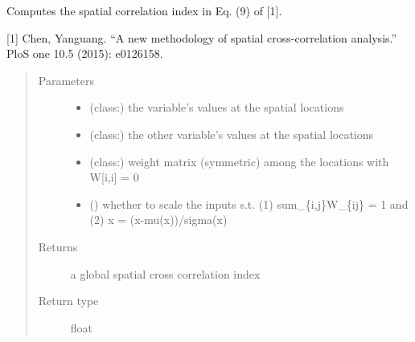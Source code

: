 \documentclass[letterpaper,10pt,english]{sphinxmanual}
\begin{document}
\begin{fulllineitems}
\label{\detokenize{api:spaotsc.SpaOTsc.sci}}
Computes the spatial correlation index in Eq. (9) of {[}1{]}.

{[}1{]} Chen, Yanguang. “A new methodology of spatial cross-correlation
analysis.” PloS one 10.5 (2015): e0126158.
\begin{quote}\begin{description}
\item[{Parameters}] \leavevmode\begin{itemize}
\item {} 
 (class:) \textendash{} the variable’s values at the spatial locations

\item {} 
 (class:) \textendash{} the other variable’s values at the spatial locations

\item {} 
 (class:) \textendash{} weight matrix (symmetric) among the locations with W{[}i,i{]} = 0

\item {} 
 () \textendash{} whether to scale the inputs s.t. (1) sum\_\{i,j\}W\_\{ij\} = 1 and (2) x = (x-mu(x))/sigma(x)

\end{itemize}

\item[{Returns}] \leavevmode
a global spatial cross correlation index

\item[{Return type}] \leavevmode
float

\end{description}\end{quote}

\end{fulllineitems}

\end{document}
